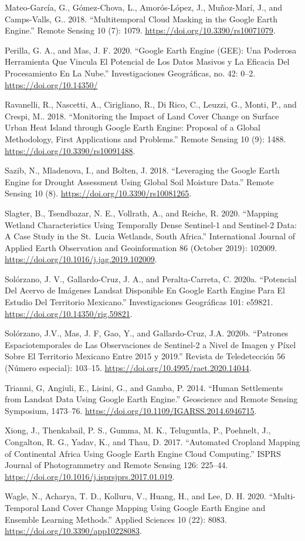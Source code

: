 \documentclass[
  12pt,
  letterpaper,
  twoside]{book}
\begin{document}
Mateo-García, G., Gómez-Chova, L., Amorós-López, J., Muñoz-Marí, J., and Camps-Valls, G.. 2018. ``Multitemporal Cloud Masking in the Google Earth Engine.'' Remote Sensing 10 (7): 1079. \url{https://doi.org/10.3390/rs10071079}.

Perilla, G. A., and Mas, J. F. 2020. ``Google Earth Engine (GEE): Una Poderosa Herramienta Que Vincula El Potencial de Los Datos Masivos y La Eficacia Del Procesamiento En La Nube.'' Investigaciones Geográficas, no. 42: 0--2. \url{https://doi.org/10.14350/}

Ravanelli, R., Nascetti, A., Cirigliano, R., Di Rico, C., Leuzzi, G., Monti, P., and Crespi, M.. 2018. ``Monitoring the Impact of Land Cover Change on Surface Urban Heat Island through Google Earth Engine: Proposal of a Global Methodology, First Applications and Problems.'' Remote Sensing 10 (9): 1488. \url{https://doi.org/10.3390/rs10091488}.

Sazib, N., Mladenova, I., and Bolten, J. 2018. ``Leveraging the Google Earth Engine for Drought Assessment Using Global Soil Moisture Data.'' Remote Sensing 10 (8). \url{https://doi.org/10.3390/rs10081265}.

Slagter, B., Tsendbazar, N. E., Vollrath, A., and Reiche, R. 2020. ``Mapping Wetland Characteristics Using Temporally Dense Sentinel-1 and Sentinel-2 Data: A Case Study in the St.~Lucia Wetlands, South Africa.'' International Journal of Applied Earth Observation and Geoinformation 86 (October 2019): 102009. \url{https://doi.org/10.1016/j.jag.2019.102009}.

Solórzano, J. V., Gallardo-Cruz, J. A., and Peralta-Carreta, C. 2020a. ``Potencial Del Acervo de Imágenes Landsat Disponible En Google Earth Engine Para El Estudio Del Territorio Mexicano.'' Investigaciones Geográficas 101: e59821. \url{https://doi.org/10.14350/rig.59821}.

Solórzano, J.V., Mas, J. F, Gao, Y., and Gallardo-Cruz, J.A. 2020b. ``Patrones Espaciotemporales de Las Observaciones de Sentinel-2 a Nivel de Imagen y Píxel Sobre El Territorio Mexicano Entre 2015 y 2019.'' Revista de Teledetección 56 (Número especial): 103--15. \url{https://doi.org/10.4995/raet.2020.14044}.

Trianni, G, Angiuli, E., Lisini, G., and Gamba, P. 2014. ``Human Settlements from Landsat Data Using Google Earth Engine.'' Geoscience and Remote Sensing Symposium, 1473--76. \url{https://doi.org/10.1109/IGARSS.2014.6946715}.

Xiong, J., Thenkabail, P. S., Gumma, M. K., Teluguntla, P., Poehnelt, J., Congalton, R. G., Yadav, K., and Thau, D. 2017. ``Automated Cropland Mapping of Continental Africa Using Google Earth Engine Cloud Computing.'' ISPRS Journal of Photogrammetry and Remote Sensing 126: 225--44. \url{https://doi.org/10.1016/j.isprsjprs.2017.01.019}.

Wagle, N., Acharya, T. D., Kolluru, V., Huang, H., and Lee, D. H. 2020. ``Multi-Temporal Land Cover Change Mapping Using Google Earth Engine and Ensemble Learning Methods.'' Applied Sciences 10 (22): 8083. \url{https://doi.org/10.3390/app10228083}.
\end{document}
